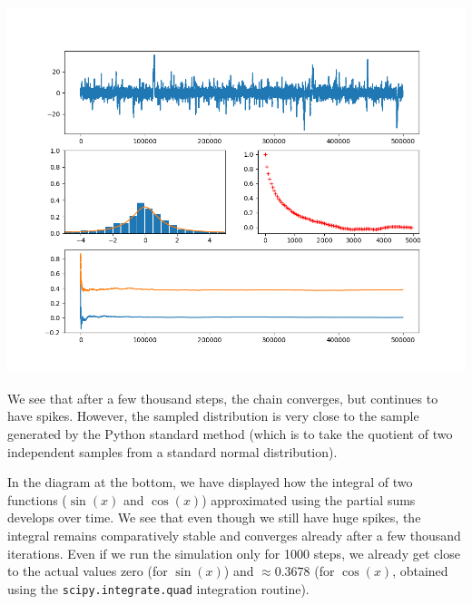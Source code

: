 \documentclass[a4paper, draft]{article}
\theoremstyle{own}
\theoremstyle{remark}
\begin{document}
\includegraphics[scale=.45]{MetropolisCauchySample.png}

We see that after a few thousand steps, the chain converges, but continues to have spikes. However, the sampled distribution is very close to the sample generated by the Python standard method (which is to take the quotient of two
independent samples from a standard normal distribution). 

In the diagram at the bottom, we have displayed how the integral of two functions ($\sin(x)$ and $\cos(x)$) approximated using the partial sums develops over time. We see that even though we still have huge spikes, the integral remains comparatively stable and converges already after a few thousand iterations. Even if we run the simulation only for 1000 steps, we already get close to the actual values zero (for $\sin(x)$) and $\approx 0.3678$ (for 
$\cos(x)$, obtained using the \verb+scipy.integrate.quad+ integration routine).
\end{document}
